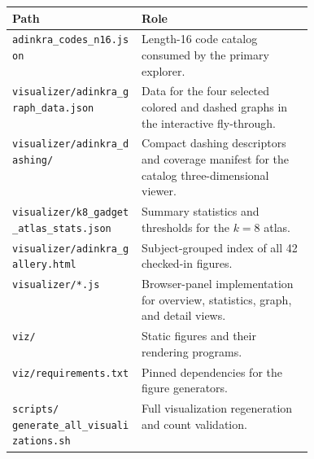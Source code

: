 \documentclass[11pt]{article}
\newcommand{\pathcode}[1]{\nolinkurl{#1}}
\newcommand{\artifactpath}[1]{{\scriptsize\pathcode{#1}}}
\begin{document}
\begin{tabularx}{\linewidth}{@{}p{0.43\linewidth}X@{}}
\toprule
Path & Role \\
\midrule
\pathcode{adinkra_codes_n16.json} & Length-16 code catalog consumed by the
primary explorer. \\
\pathcode{visualizer/adinkra_graph_data.json} & Data for the four selected
colored and dashed graphs in the interactive fly-through. \\
\pathcode{visualizer/adinkra_dashing/} & Compact dashing descriptors and
coverage manifest for the catalog three-dimensional viewer. \\
\pathcode{visualizer/k8_gadget_atlas_stats.json} & Summary statistics and
thresholds for the $k=8$ atlas. \\
\pathcode{visualizer/adinkra_gallery.html} & Subject-grouped index of all 42
checked-in figures. \\
\pathcode{visualizer/*.js} & Browser-panel implementation for overview,
statistics, graph, and detail views. \\
\pathcode{viz/} & Static figures and their rendering programs. \\
\pathcode{viz/requirements.txt} & Pinned dependencies for the figure generators. \\
\shortstack[l]{\artifactpath{scripts/}\\\artifactpath{generate_all_visualizations.sh}} & Full visualization
regeneration and count validation. \\
\bottomrule
\end{tabularx}
\end{document}
